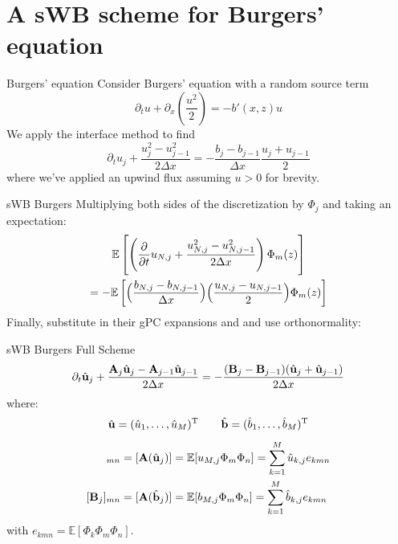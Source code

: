 \documentclass[
    pdf,
    11pt,
    xcolor={svgnames},
  ]{beamer}
\begin{document}
\section{A sWB scheme for Burgers' equation}

\begin{frame}{Burgers' equation}
    Consider Burgers' equation with a random source term
    \begin{equation} \label{eq:sburgers}
        \partial_t u + \partial_x \left( \frac{u^2}{2} \right) = -b'(x,z) u
    \end{equation}
    \pause
    We apply the interface method to find
    \begin{equation} \label{eq:burgers_inteface}
        \partial_t u_j + \frac{u_j^2 - u_{j-1}^2}{2 \Delta x} = -\frac{b_j - b_{j-1}}{\Delta x} \frac{u_j + u_{j-1}}{2}
    \end{equation}
    where we've applied an upwind flux assuming $u > 0$ for brevity.
\end{frame}

\begin{frame}{sWB Burgers}
    Multiplying both sides of the discretization by $\Phi_j$ and taking an expectation:
    \begin{multline*}
        \mathbb{E}\left[
            \left(
                \pdv{}{t} u_{N,j} + \frac{u_{N,j}^2-u_{N,j-1}^2}{2\Delta x}
            \right) \Phi_m(z)
        \right] \\
        = -\mathbb{E} \left[
            \Big(\frac{b_{N,j} - b_{N,j-1}}{\Delta x}\Big)\Big( \frac{u_{N,j} - u_{N,j-1}}{2}\Big) \Phi_m(z)
        \right]
    \end{multline*}
    Finally, substitute in their gPC expansions and and use orthonormality:
\end{frame}

\begin{frame}{sWB Burgers Full Scheme}
   \begin{equation}
       \partial_t \hat{\vb{u}}_j + \frac{\vb{A}_j \hat{\vb{u}}_j - \vb{A}_{j-1} \hat{\vb{u}}_{j-1}}{2\Delta x} = -\frac{(\vb{B}_j - \vb{B}_{j-1})(\hat{\vb{u}}_j + \hat{\vb{u}}_{j-1})}{2\Delta x}
   \end{equation} 
   where:
   \begin{equation*}
       \hat{\vb{u}} = (\hat{u}_1, \dots, \hat{u}_M)^\mathrm{T}
       \qquad
       \hat{\vb{b}} = (\hat{b}_1, \dots, \hat{b}_M)^\mathrm{T}
   \end{equation*}
   \begin{align*}
       [\vb{A}_j]_{mn} = [\vb{A}(\hat{\vb{u}}_j)] &= \mathbb{E}[u_{M,j} \Phi_m \Phi_n] = \sum_{k=1}^M \hat{u}_{k,j} e_{kmn} \\
       [\vb{B}_j]_{mn} = [\vb{A}(\hat{\vb{b}}_j)] &= \mathbb{E}[b_{M,j} \Phi_m \Phi_n] = \sum_{k=1}^M \hat{b}_{k,j} e_{kmn}
   \end{align*}
   with $e_{kmn} = \mathbb{E}[\Phi_k \Phi_m \Phi_n]$.
\end{frame}
\end{document}
